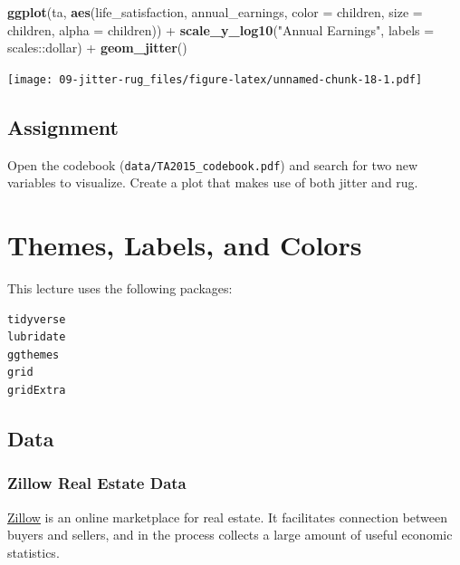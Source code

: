 \documentclass[]{book}
\newenvironment{Shaded}{\begin{snugshade}}{\end{snugshade}}
\newcommand{\KeywordTok}[1]{\textcolor[rgb]{0.13,0.29,0.53}{\textbf{{#1}}}}
\newcommand{\DataTypeTok}[1]{\textcolor[rgb]{0.13,0.29,0.53}{{#1}}}
\newcommand{\StringTok}[1]{\textcolor[rgb]{0.31,0.60,0.02}{{#1}}}
\newcommand{\NormalTok}[1]{{#1}}
\theoremstyle{definition}
\theoremstyle{definition}
\theoremstyle{remark}
\begin{document}
\begin{Shaded}
\begin{Highlighting}[]
\KeywordTok{ggplot}\NormalTok{(ta, }\KeywordTok{aes}\NormalTok{(life_satisfaction, annual_earnings, }\DataTypeTok{color =} \NormalTok{children, }\DataTypeTok{size =} \NormalTok{children, }\DataTypeTok{alpha =} \NormalTok{children)) +}\StringTok{ }
\StringTok{  }\KeywordTok{scale_y_log10}\NormalTok{(}\StringTok{"Annual Earnings"}\NormalTok{, }\DataTypeTok{labels =} \NormalTok{scales::dollar) +}\StringTok{ }
\StringTok{  }\KeywordTok{geom_jitter}\NormalTok{()}
\end{Highlighting}
\end{Shaded}

\texttt{[image: 09-jitter-rug\_files/figure-latex/unnamed-chunk-18-1.pdf]}

\section{Assignment}\label{assignment-8}

Open the codebook (\texttt{data/TA2015\_codebook.pdf}) and search for
two new variables to visualize. Create a plot that makes use of both
jitter and rug.

\hypertarget{themes-labels-colors}{\chapter{Themes, Labels, and
Colors}\label{themes-labels-colors}}

This lecture uses the following packages:

\begin{verbatim}
tidyverse
lubridate
ggthemes
grid
gridExtra
\end{verbatim}

\section{Data}\label{data-7}

\subsection{Zillow Real Estate Data}\label{zillow-real-estate-data}

\href{https://www.zillow.com/}{Zillow} is an online marketplace for real
estate. It facilitates connection between buyers and sellers, and in the
process collects a large amount of useful economic statistics.
\end{document}
